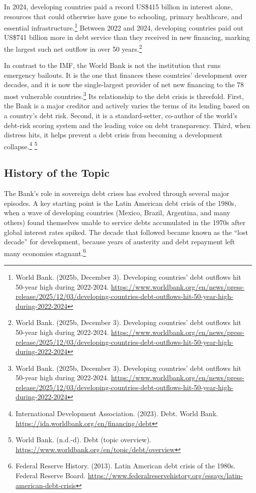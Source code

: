 In 2024, developing countries paid a record US\$415 billion in interest alone, resources that could otherwise have gone to schooling, primary healthcare, and essential infrastructure.\footnote{World Bank. (2025b, December 3). Developing countries’ debt outflows hit 50-year high during 2022-2024. \url{https://www.worldbank.org/en/news/press-release/2025/12/03/developing-countries-debt-outflows-hit-50-year-high-during-2022-2024}} Between 2022 and 2024, developing countries paid out US\$741 billion more in debt service than they received in new financing, marking the largest such net outflow in over 50 years.\footnote{World Bank. (2025b, December 3). Developing countries’ debt outflows hit 50-year high during 2022-2024. \url{https://www.worldbank.org/en/news/press-release/2025/12/03/developing-countries-debt-outflows-hit-50-year-high-during-2022-2024}}

In contrast to the IMF, the World Bank is not the institution that runs emergency bailouts. It is the one that finances these countries’ development over decades, and it is now the single-largest provider of net new financing to the 78 most vulnerable countries.\footnote{World Bank. (2025b, December 3). Developing countries’ debt outflows hit 50-year high during 2022-2024. \url{https://www.worldbank.org/en/news/press-release/2025/12/03/developing-countries-debt-outflows-hit-50-year-high-during-2022-2024}} Its relationship to the debt crisis is threefold. First, the Bank is a major creditor and actively varies the terms of its lending based on a country’s debt risk. Second, it is a standard-setter, co-author of the world’s debt-risk scoring system and the leading voice on debt transparency. Third, when distress hits, it helps prevent a debt crisis from becoming a development collapse.\footnote{International Development Association. (2023). Debt. World Bank. \url{https://ida.worldbank.org/en/financing/debt}} \footnote{World Bank. (n.d.-d). Debt (topic overview). \url{https://www.worldbank.org/en/topic/debt/overview}}

\subsection{History of the Topic}

The Bank’s role in sovereign debt crises has evolved through several major episodes. A key starting point is the Latin American debt crisis of the 1980s, when a wave of developing countries (Mexico, Brazil, Argentina, and many others) found themselves unable to service debts accumulated in the 1970s after global interest rates spiked. The decade that followed became known as the “lost decade” for development, because years of austerity and debt repayment left many economies stagnant.\footnote{Federal Reserve History. (2013). Latin American debt crisis of the 1980s. Federal Reserve Board. \url{https://www.federalreservehistory.org/essays/latin-american-debt-crisis}}

